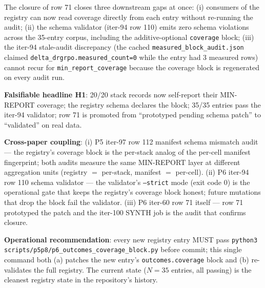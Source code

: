 The closure of row 71 closes three downstream gaps at once: (i) consumers
of the registry can now read coverage directly from each entry without
re-running the audit; (ii) the schema validator (iter-94 row 110) emits
zero schema violations across the 35-entry corpus, including the
additive-optional \texttt{coverage} block; (iii) the iter-94
stale-audit discrepancy (the cached \texttt{measured\_block\_audit.json}
claimed \texttt{delta\_drgrpo.measured\_count=0} while the entry had 3
measured rows) cannot recur for \texttt{min\_report\_coverage} because
the coverage block is regenerated on every audit run.

\textbf{Falsifiable headline H1}: 20/20 stack records now self-report
their MIN-REPORT coverage; the registry schema declares the block;
35/35 entries pass the iter-94 validator; row 71 is promoted from
``prototyped pending schema patch'' to ``validated'' on real data.

\textbf{Cross-paper coupling}: (i) P5 iter-97 row 112 manifest schema
mismatch audit --- the registry's coverage block is the per-stack
analog of the per-cell manifest fingerprint; both audits measure the
same MIN-REPORT layer at different aggregation units (registry $=$
per-stack, manifest $=$ per-cell). (ii) P6 iter-94 row 110 schema
validator --- the validator's \texttt{--strict} mode (exit code 0) is
the operational gate that keeps the registry's coverage block honest;
future mutations that drop the block fail the validator. (iii) P6
iter-60 row 71 itself --- row 71 prototyped the patch and the iter-100
SYNTH job is the audit that confirms closure.

\textbf{Operational recommendation}: every new registry entry MUST pass
\texttt{python3 scripts/p5p8/p6_outcomes\_coverage\_block.py} before
commit; this single command both (a) patches the new entry's
\texttt{outcomes.coverage} block and (b) re-validates the full registry.
The current state ($N{=}35$ entries, all passing) is the cleanest
registry state in the repository's history.